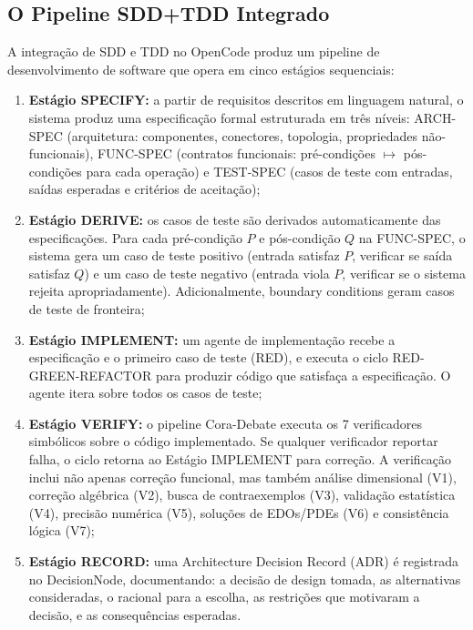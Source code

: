 \documentclass[12pt,a4paper,sumario=tradicional,openany]{abntex2}
\begin{document}
\subsection{O Pipeline SDD+TDD Integrado}

A integração de SDD e TDD no OpenCode produz um pipeline de desenvolvimento de software que opera em cinco estágios sequenciais:

\begin{enumerate}[leftmargin=*]
    \item \textbf{Estágio SPECIFY:} a partir de requisitos descritos em linguagem natural, o sistema produz uma especificação formal estruturada em três níveis: ARCH-SPEC (arquitetura: componentes, conectores, topologia, propriedades não-funcionais), FUNC-SPEC (contratos funcionais: pré-condições $\mapsto$ pós-condições para cada operação) e TEST-SPEC (casos de teste com entradas, saídas esperadas e critérios de aceitação);
    \item \textbf{Estágio DERIVE:} os casos de teste são derivados automaticamente das especificações. Para cada pré-condição $P$ e pós-condição $Q$ na FUNC-SPEC, o sistema gera um caso de teste positivo (entrada satisfaz $P$, verificar se saída satisfaz $Q$) e um caso de teste negativo (entrada viola $P$, verificar se o sistema rejeita apropriadamente). Adicionalmente, boundary conditions geram casos de teste de fronteira;
    \item \textbf{Estágio IMPLEMENT:} um agente de implementação recebe a especificação e o primeiro caso de teste (RED), e executa o ciclo RED-GREEN-REFACTOR para produzir código que satisfaça a especificação. O agente itera sobre todos os casos de teste;
    \item \textbf{Estágio VERIFY:} o pipeline Cora-Debate executa os 7 verificadores simbólicos sobre o código implementado. Se qualquer verificador reportar falha, o ciclo retorna ao Estágio IMPLEMENT para correção. A verificação inclui não apenas correção funcional, mas também análise dimensional (V1), correção algébrica (V2), busca de contraexemplos (V3), validação estatística (V4), precisão numérica (V5), soluções de EDOs/PDEs (V6) e consistência lógica (V7);
    \item \textbf{Estágio RECORD:} uma Architecture Decision Record (ADR) é registrada no DecisionNode, documentando: a decisão de design tomada, as alternativas consideradas, o racional para a escolha, as restrições que motivaram a decisão, e as consequências esperadas.
\end{enumerate}
\end{document}
